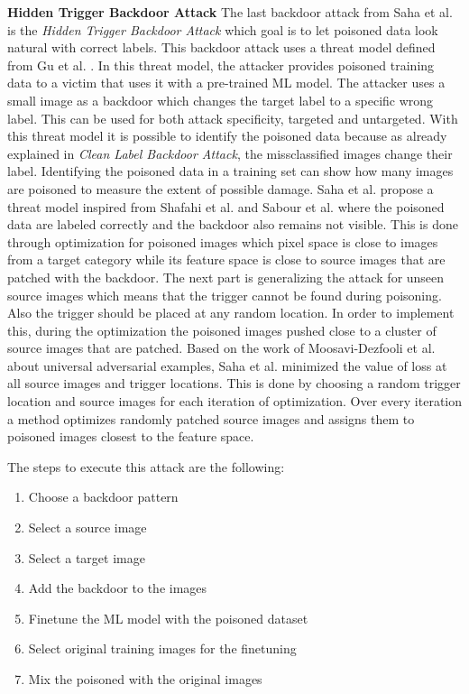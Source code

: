 \textbf{Hidden Trigger Backdoor Attack} The last backdoor attack from Saha et al. \cite{DBLP:journals/corr/abs-1910-00033} is the \textit{Hidden Trigger Backdoor Attack} which goal is to let poisoned data look natural with correct labels. This backdoor attack uses a threat model defined from Gu et al. \cite{DBLP:journals/corr/abs-1708-06733}. In this threat model, the attacker provides poisoned training data to a victim that uses it with a pre-trained ML model. The attacker uses a small image as a backdoor which changes the target label to a specific wrong label. This can be used for both attack specificity, targeted and untargeted. With this threat model it is possible to identify the poisoned data because as already explained in \textit{Clean Label Backdoor Attack}, the missclassified images change their label. Identifying the poisoned data in a training set can show how many images are poisoned to measure the extent of possible damage. Saha et al. propose a threat model inspired
from Shafahi et al. \cite{DBLP:journals/corr/abs-1804-00792} and Sabour et al. \cite{DBLP:journals/corr/SabourCFF15} where the poisoned data are labeled correctly and the backdoor also remains not visible. This is done through optimization for poisoned images which pixel space is close to images from a target category while its feature space is close to source images that are patched with the backdoor. The next part is generalizing the attack for unseen source images which means that the trigger cannot be found during poisoning. Also the trigger should be placed at any random location. In order to implement this, during the optimization the poisoned images pushed close to a cluster of source images that are patched. Based on the
work of Moosavi-Dezfooli et al. \cite{DBLP:conf/cvpr/Moosavi-Dezfooli17} about universal adversarial examples, Saha et al. minimized the value of loss at all source images and trigger locations. This is done by choosing a random trigger location and source images for each iteration of optimization. Over every iteration a method optimizes randomly patched source images and assigns them to poisoned images closest to the feature space.

The steps to execute this attack are the following:

\begin{enumerate}
  \item Choose a backdoor pattern
  \item Select a source image
  \item Select a target image
  \item Add the backdoor to the images
  \item Finetune the ML model with the poisoned dataset
  \item Select original training images for the finetuning
  \item Mix the poisoned with the original images
\end{enumerate}

